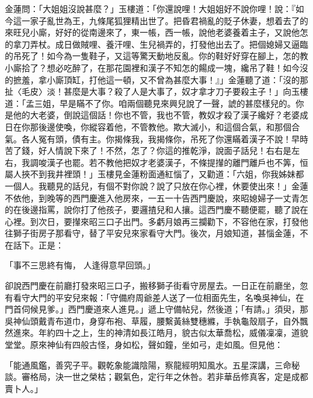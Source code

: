 金蓮問：「大姐姐沒說甚麼？」玉樓道：「你還說哩！大姐姐好不說你哩！說：『如今這一家子亂世為王，九條尾狐狸精出世了。把昏君禍亂的貶子休妻，想着去了的來旺兒小廝，好好的從南邊來了，東一帳，西一帳，說他老婆養着主子，又說他怎的拿刀弄杖。成日做賊哩、養汗哩、生兒禍弄的，打發他出去了。把個媳婦又逼臨的吊死了！如今為一隻鞋子，又這等驚天動地反亂。你的鞋好好穿在腳上，怎的教小廝拾了？想必吃醉了，在那花園裡和漢子不知怎的餳成一塊，纔吊了鞋！如今沒的摭羞，拿小廝頂缸，打他這一頓，又不曾為甚麼大事！』」金蓮聽了道：「沒的那扯〈毛皮〉淡！甚麼是大事？殺了人是大事了，奴才拿才刀子要殺主子！」向玉樓道：「孟三姐，早是瞞不了你。咱兩個聽見來興兒說了一聲，諕的甚麼樣兒的。你是他的大老婆，倒說這個話！你也不管，我也不管，教奴才殺了漢子纔好？老婆成日在你那後邊使喚，你縱容着他，不管教他。欺大滅小，和這個合氣，和那個合氣。各人冤有頭，債有主。你揭條我，我揭條你，吊死了你還瞞着漢子不說！早時苦了錢，好人情說下來了！不然，怎了？你這的推乾淨，說面子話兒！右右是左右，我調唆漢子也罷。若不教他把奴才老婆漢子，不條提攆的離門離戶也不筭，恒屬人挾不到我井裡頭！」玉樓見金蓮粉面通紅惱了，又勸道：「六姐，你我姊妹都一個人。我聽見的話兒，有個不對你說？說了只放在你心裡，休要使出來！」金蓮不依他，到晚等的西門慶進入他房來，一五一十告西門慶說，來昭媳婦子一丈青怎的在後邊指罵，說你打了他孩子，要邏揸兒和人攘。這西門慶不聽便罷，聽了說在心裡。到次日，要攆來昭三口子出門。多虧月娘再三攔勸下，不容他在家，打發他往獅子街房子那看守，替了平安兒來家看守大門。後次，月娘知道，甚惱金蓮，不在話下。正是：

「事不三思終有悔，  人逢得意早回頭。」

卻說西門慶在前廳打發來昭三口子，搬移獅子街看守房屋去。一日正在前廳坐，忽有看守大門的平安兒來報：「守備府周爺差人送了一位相面先生，名喚吳神仙，在門首伺候見爹。」西門慶道來人進見。」遞上守備帖兒，然後道；「有請。」須臾，那吳神仙頭戴青布道巾，身穿布袍、草履，腰繫黃絲雙穗縧，手執龜殼扇子，自外飄然進來。年約四十之上，生的神清如長江皓月，貌古似太華喬松，威儀凜凜，道貌堂堂。原來神仙有四般古怪，身如松，聲如鐘，坐如弓，走如風。但見他：

「能通風鑑，善究子平。觀乾象能識陰陽，察龍經明知風水。五星深講，三命秘談。審格局，決一世之榮枯；觀氣色，定行年之休咎。若非華岳修真客，定是成都賣卜人。」

